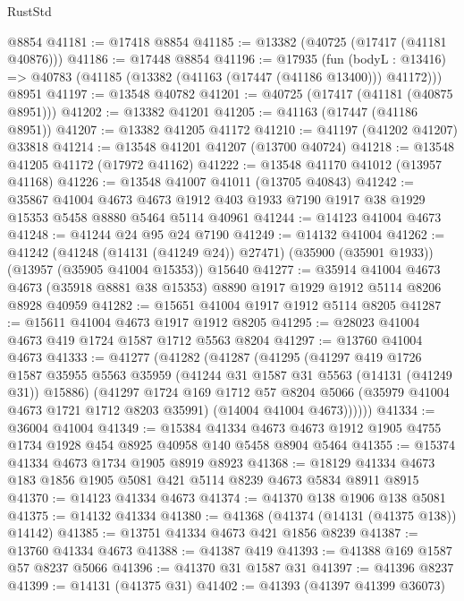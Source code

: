 \begin{lexlean}{RustStd}
\begin{coremodule}
    @8854
@41181 := @17418 @8854
@41185 := @13382 (@40725 (@17417 (@41181 @40876)))
@41186 := @17448 @8854
@41196 := @17935
    (fun (bodyL : @13416) => @40783 (@41185 (@13382 (@41163 (@17447 (@41186 @13400))) @41172)))
    @8951
@41197 := @13548 @40782
@41201 := @40725 (@17417 (@41181 (@40875 @8951)))
@41202 := @13382 @41201
@41205 := @41163 (@17447 (@41186 @8951))
@41207 := @13382 @41205 @41172
@41210 := @41197 (@41202 @41207) @33818
@41214 := @13548 @41201 @41207 (@13700 @40724)
@41218 := @13548 @41205 @41172 (@17972 @41162)
@41222 := @13548 @41170 @41012 (@13957 @41168)
@41226 := @13548 @41007 @41011 (@13705 @40843)
@41242 := @35867
    @41004
    @4673
    @4673
    @1912
    @403
    @1933
    @7190
    @1917
    @38
    @1929
    @15353
    @5458
    @8880
    @5464
    @5114
    @40961
@41244 := @14123 @41004 @4673
@41248 := @41244 @24 @95 @24 @7190
@41249 := @14132 @41004
@41262 := @41242
    (@41248 (@14131 (@41249 @24)) @27471)
    (@35900 (@35901 @1933))
    (@13957 (@35905 @41004 @15353))
    @15640
@41277 := @35914
    @41004
    @4673
    @4673
    (@35918 @8881 @38 @15353)
    @8890
    @1917
    @1929
    @1912
    @5114
    @8206
    @8928
    @40959
@41282 := @15651 @41004 @1917 @1912 @5114 @8205
@41287 := @15611 @41004 @4673 @1917 @1912 @8205
@41295 := @28023 @41004 @4673 @419 @1724 @1587 @1712 @5563 @8204
@41297 := @13760 @41004 @4673
@41333 := @41277
    (@41282
      (@41287
        (@41295
          (@41297
            @419
            @1726
            @1587
            @35955
            @5563
            @35959
            (@41244 @31 @1587 @31 @5563 (@14131 (@41249 @31)) @15886)
            (@41297
              @1724
              @169
              @1712
              @57
              @8204
              @5066
              (@35979 @41004 @4673 @1721 @1712 @8203 @35991)
              (@14004 @41004 @4673))))))
@41334 := @36004 @41004
@41349 := @15384
    @41334
    @4673
    @4673
    @1912
    @1905
    @4755
    @1734
    @1928
    @454
    @8925
    @40958
    @140
    @5458
    @8904
    @5464
@41355 := @15374 @41334 @4673 @1734 @1905 @8919 @8923
@41368 := @18129 @41334 @4673 @183 @1856 @1905 @5081 @421 @5114 @8239 @4673 @5834 @8911 @8915
@41370 := @14123 @41334 @4673
@41374 := @41370 @138 @1906 @138 @5081
@41375 := @14132 @41334
@41380 := @41368 (@41374 (@14131 (@41375 @138)) @14142)
@41385 := @13751 @41334 @4673 @421 @1856 @8239
@41387 := @13760 @41334 @4673
@41388 := @41387 @419
@41393 := @41388 @169 @1587 @57 @8237 @5066
@41396 := @41370 @31 @1587 @31
@41397 := @41396 @8237
@41399 := @14131 (@41375 @31)
@41402 := @41393 (@41397 @41399 @36073)

\end{coremodule}
\end{lexlean}
